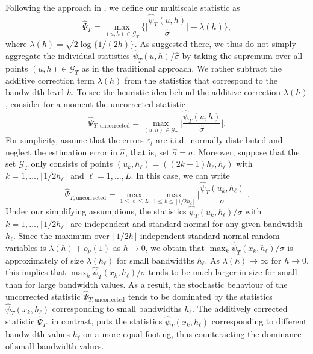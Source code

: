 \documentclass[a4paper,12pt]{article}
\numberwithin{equation}{section}
\begin{document}
Following the approach in \cite{DuembgenSpokoiny2001}, we define our multiscale statistic as 
\[ \widehat{\Psi}_T = \max_{(u,h) \in \mathcal{G}_T} \Big\{ \Big|\frac{\widehat{\psi}_T(u,h)}{\widehat{\sigma}}\Big| - \lambda(h) \Big\}, \] 
where $\lambda(h) = \sqrt{2 \log \{ 1/(2h) \}}$. As suggested there, we thus do not simply aggregate the individual statistics $\widehat{\psi}_T(u,h)/\widehat{\sigma}$ by taking the supremum over all points $(u,h) \in \mathcal{G}_T$ as in the traditional approach. We rather subtract the additive correction term $\lambda(h)$ from the statistics that correspond to the bandwidth level $h$. To see the heuristic idea behind the additive correction $\lambda(h)$, consider for a moment the uncorrected statistic
\[ \widehat{\Psi}_{T,\text{uncorrected}} = \max_{(u,h) \in \mathcal{G}_T} \Big|\frac{\widehat{\psi}_T(u,h)}{\widehat{\sigma}}\Big|. \]
For simplicity, assume that the errors $\varepsilon_t$ are i.i.d.\ normally distributed and neglect the estimation error in $\widehat{\sigma}$, that is, set $\widehat{\sigma} = \sigma$. Moreover, suppose that the set $\mathcal{G}_T$ only consists of points $(u_k,h_\ell) = ((2k - 1)h_\ell,h_\ell)$ with $k = 1,\ldots,\lfloor 1/2h_\ell \rfloor$ and $\ell = 1,\ldots,L$. In this case, we can write
\[ \widehat{\Psi}_{T,\text{uncorrected}} = \max_{1 \le \ell \le L} \max_{1 \le k \le \lfloor 1/2h_\ell \rfloor} \Big|\frac{\widehat{\psi}_T(u_k,h_\ell)}{\sigma}\Big|. \]
Under our simplifying assumptions, the statistics $\widehat{\psi}_T(u_k,h_\ell)/\sigma$ with $k = 1,\ldots,\lfloor 1/2h_\ell \rfloor$ are independent and standard normal for any given bandwidth $h_\ell$. Since the maximum over $\lfloor 1/2h \rfloor$ independent standard normal random variables is $\lambda(h) + o_p(1)$ as $h \rightarrow 0$, we obtain that $\max_{k} \widehat{\psi}_T(x_k,h_\ell)/\sigma$ is approximately of size $\lambda(h_\ell)$ for small bandwidths $h_\ell$. As $\lambda(h) \rightarrow \infty$ for $h \rightarrow 0$, this implies that $\max_{k} \widehat{\psi}_T(x_k,h_\ell)/\sigma$ tends to be much larger in size for small than for large bandwidth values. As a result, the stochastic behaviour of the uncorrected statistic $\widehat{\Psi}_{T,\text{uncorrected}}$ tends to be dominated by the statistics $\widehat{\psi}_T(x_k,h_\ell)$ corresponding to small bandwidths $h_\ell$. The additively corrected statistic $\widehat{\Psi}_T$, in contrast, puts the statistics $\widehat{\psi}_T(x_k,h_\ell)$ corresponding to different bandwidth values $h_\ell$ on a more equal footing, thus counteracting the dominance of small bandwidth values. 
\end{document}
